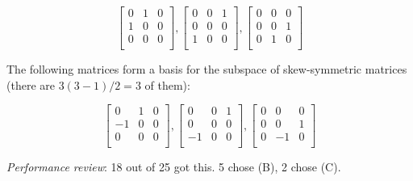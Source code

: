 \documentclass[10pt]{amsart}
\begin{document}
\begin{enumerate}
  $$\left[\begin{matrix} 0 & 1 & 0 \\ 1 & 0 & 0 \\ 0 & 0 & 0 \\\end{matrix}\right], \left[\begin{matrix} 0 & 0 & 1 \\ 0 & 0 & 0 \\ 1 & 0 & 0 \\\end{matrix}\right], \left[\begin{matrix} 0 & 0 & 0 \\ 0 & 0 & 1 \\ 0 & 1 & 0 \\\end{matrix}\right]$$

  The following matrices form a basis for the subspace of
  skew-symmetric matrices (there are $3(3 - 1)/2 = 3$ of them):

  $$\left[ \begin{matrix} 0 & 1 & 0 \\ -1 & 0 & 0 \\ 0 & 0 & 0 \\\end{matrix}\right], \left[\begin{matrix} 0 & 0 & 1 \\ 0 & 0 & 0 \\ -1 & 0 & 0 \\\end{matrix}\right], \left[\begin{matrix} 0 & 0 & 0 \\ 0 & 0 & 1 \\ 0 & -1 & 0 \\\end{matrix}\right]$$

  {\em Performance review}: 18 out of 25 got this. 5 chose (B), 2 chose (C).

\end{enumerate}
\end{document}
